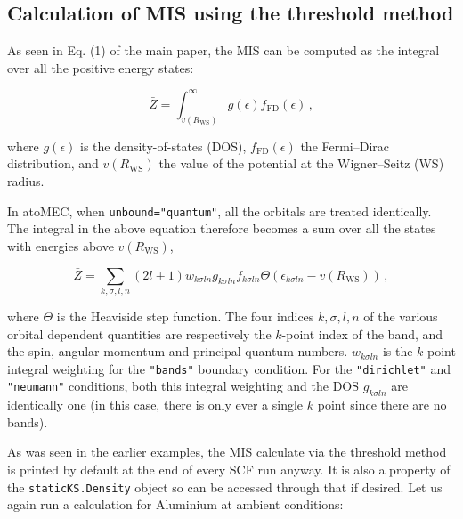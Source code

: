 \documentclass[9pt]{article}
\begin{document}
\hypertarget{calculation-of-mis-using-the-threshold-method}{%
\subsection{Calculation of MIS using the threshold
method}\label{calculation-of-mis-using-the-threshold-method}}

As seen in Eq. (1) of the main paper, the MIS can be computed as the
integral over all the positive energy states:

\begin{equation}
\bar{Z} = \int_{v(R_\textrm{WS})}^\infty g(\epsilon) f_\textrm{FD}(\epsilon)\,,
\end{equation}

where \(g(\epsilon)\) is the density-of-states (DOS),
\(f_\textrm{FD}(\epsilon)\) the Fermi--Dirac distribution, and
\(v(R_\textrm{WS})\) the value of the potential at the Wigner--Seitz
(WS) radius.

In atoMEC, when \texttt{unbound="quantum"}, all the orbitals are treated
identically. The integral in the above equation therefore becomes a sum
over all the states with energies above \(v(R_\textrm{WS})\),

\begin{equation}
\bar{Z} = \sum_{k,\sigma,l,n} (2l+1) w_{k\sigma ln} g_{k\sigma ln} f_{k\sigma ln} \Theta(\epsilon_{k\sigma ln}-v(R_\textrm{WS}))\,,
\end{equation}

where \(\Theta\) is the Heaviside step function. The four indices
\(k,\sigma,l,n\) of the various orbital dependent quantities are
respectively the \(k\)-point index of the band, and the spin, angular
momentum and principal quantum numbers. \(w_{k\sigma ln}\) is the
\(k\)-point integral weighting for the \texttt{"bands"} boundary
condition. For the \texttt{"dirichlet"} and \texttt{"neumann"}
conditions, both this integral weighting and the DOS \(g_{k\sigma ln}\)
are identically one (in this case, there is only ever a single \(k\)
point since there are no bands).

As was seen in the earlier examples, the MIS calculate via the threshold
method is printed by default at the end of every SCF run anyway. It is
also a property of the \texttt{staticKS.Density} object so can be
accessed through that if desired. Let us again run a calculation for
Aluminium at ambient conditions:
\end{document}
